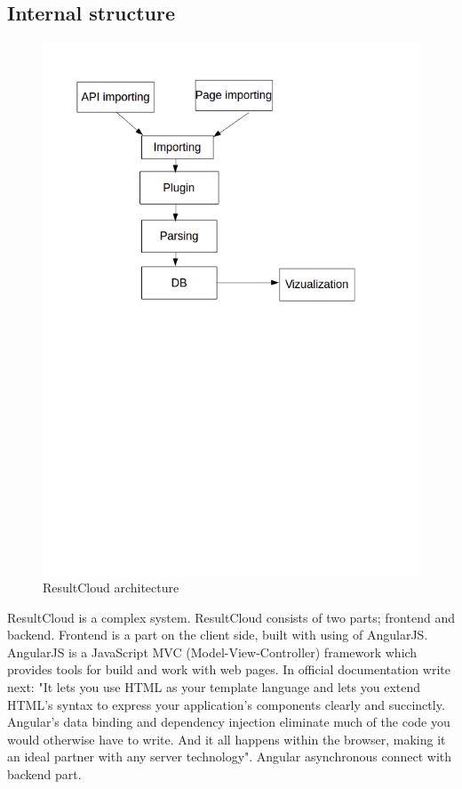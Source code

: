 \subsection{Internal structure}

\begin{figure}
  \centering
    \includegraphics[trim=0 13.41cm 0 0,scale=0.5]{fig/result-cloud.png}
  \caption{ResultCloud architecture}
  \label{fig:result_cloud}
\end{figure}

ResultCloud is a complex system. ResultCloud consists of two parts; frontend and backend. Frontend is a part on the client side, built with using of AngularJS. AngularJS is a JavaScript MVC (Model-View-Controller) framework which provides tools for build and work with web pages. In official documentation write next: "It lets you use HTML as your template language and lets you extend HTML's syntax to express your application's components clearly and succinctly. Angular's data binding and dependency injection eliminate much of the code you would otherwise have to write. And it all happens within the browser, making it an ideal partner with any server technology"\cite{angularJS}. Angular asynchronous connect with backend part. 

